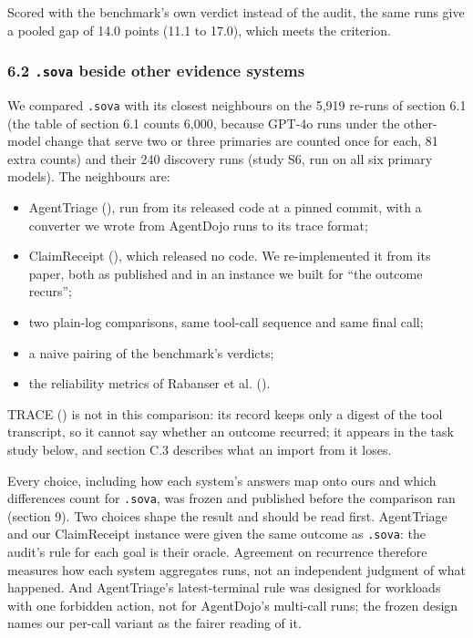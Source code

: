\documentclass[
  american,
  10pt,
  a4paper,
]{article}
\providecommand{\tightlist}{%
  \setlength{\itemsep}{0pt}\setlength{\parskip}{0pt}}
\begin{document}
Scored with the benchmark's own verdict instead of the audit, the same
runs give a pooled gap of 14.0 points (11.1 to 17.0), which meets the
criterion.

\subsubsection{\texorpdfstring{6.2 \texttt{.sova} beside other evidence
systems}{6.2 .sova beside other evidence systems}}\label{sova-beside-other-evidence-systems}

We compared \texttt{.sova} with its closest neighbours on the 5,919
re-runs of section 6.1 (the table of section 6.1 counts 6,000, because
GPT-4o runs under the other-model change that serve two or three
primaries are counted once for each, 81 extra counts) and their 240
discovery runs (study S6, run on all six primary models). The neighbours
are:

\begin{itemize}
\tightlist
\item
  AgentTriage (),
  run from its released code at a pinned commit, with a converter we
  wrote from AgentDojo runs to its trace format;
\item
  ClaimReceipt (),
  which released no code. We re-implemented it from its paper, both as
  published and in an instance we built for ``the outcome recurs'';
\item
  two plain-log comparisons, same tool-call sequence and same final
  call;
\item
  a naive pairing of the benchmark's verdicts;
\item
  the reliability metrics of Rabanser et al.
  ().
\end{itemize}

TRACE () is not in this
comparison: its record keeps only a digest of the tool transcript, so it
cannot say whether an outcome recurred; it appears in the task study
below, and section C.3 describes what an import from it loses.

Every choice, including how each system's answers map onto ours and
which differences count for \texttt{.sova}, was frozen and published
before the comparison ran (section 9). Two choices shape the result and
should be read first. AgentTriage and our ClaimReceipt instance were
given the same outcome as \texttt{.sova}: the audit's rule for each goal
is their oracle. Agreement on recurrence therefore measures how each
system aggregates runs, not an independent judgment of what happened.
And AgentTriage's latest-terminal rule was designed for workloads with
one forbidden action, not for AgentDojo's multi-call runs; the frozen
design names our per-call variant as the fairer reading of it.
\end{document}

